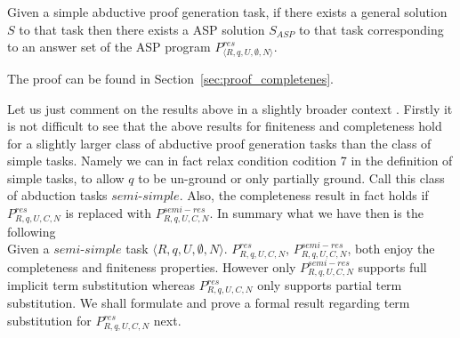 
\begin{theorem}[Completeness]\label{thm:completeness}
  Given a simple abductive proof generation task, if there exists a general solution $S$ to that task then there
  exists a ASP solution $S_{ASP}$ to that task corresponding to an answer set of the ASP program $P_{\langle R,q,U,\emptyset,N\rangle}^{res}$.
\end{theorem}

The proof can be found in Section~\ref{sec:proof_completenes}.

Let us just comment on the results above in a slightly broader context . Firstly it is not difficult to see that the above results for finiteness and completeness hold for a slightly larger class of abductive proof generation tasks than the class of simple tasks. Namely we can in fact relax condition codition 7 in the definition of simple tasks, to allow $q$ to be un-ground or only partially ground. Call this class of abduction tasks $semi$-$simple$.  Also, the completeness result in fact holds if $P_{R,q,U,C,N}^{res}$ is replaced with $P_{R,q,U,C,N}^{semi-res}$. In summary what we have then is the following\\
Given a $\textit{semi-simple}$ task $\langle R,q,U,\emptyset,N\rangle$. $P_{R,q,U,C,N}^{res}$, $P_{R,q,U,C,N}^{semi-res}$, both enjoy the completeness and finiteness properties. However only $P_{R,q,U,C,N}^{semi-res}$ supports full implicit term substitution whereas $P_{R,q,U,C,N}^{res}$ only supports partial term substitution. We shall formulate and prove a formal result regarding term substitution for $P_{R,q,U,C,N}^{res}$ next.    


